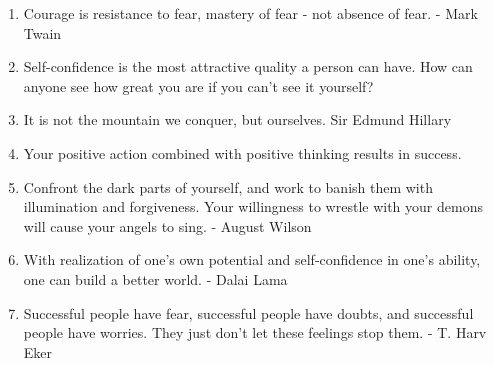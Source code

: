 \begin{enumerate}
            \item Courage is resistance to fear, mastery of fear - not absence of fear. - Mark Twain

            \item Self-confidence is the most attractive quality a person can have. How can anyone see how great you are if you can’t see it yourself?

            \item It is not the mountain we conquer, but ourselves. Sir Edmund Hillary

            \item Your positive action combined with positive thinking results in success.

            \item Confront the dark parts of yourself, and work to banish them with illumination and forgiveness. Your willingness to wrestle with your demons will cause your angels to sing. - August Wilson

            \item With realization of one’s own potential and self-confidence in one’s ability, one can build a better world. - Dalai Lama

            \item Successful people have fear, successful people have doubts, and successful people have worries. They just don’t let these feelings stop them. - T. Harv Eker
        \end{enumerate}

